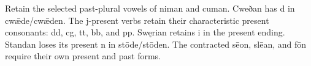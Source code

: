 Retain the selected past-plural vowels of niman and cuman. Cweðan has d in cwǣde/\allowbreak{}cwǣden. The j-present verbs retain their characteristic present consonants: dd, cg, tt, bb, and pp. Swęrian retains i in the present ending. Standan loses its present n in stōde/\allowbreak{}stōden. The contracted sēon, slēan, and fōn require their own present and past forms.

